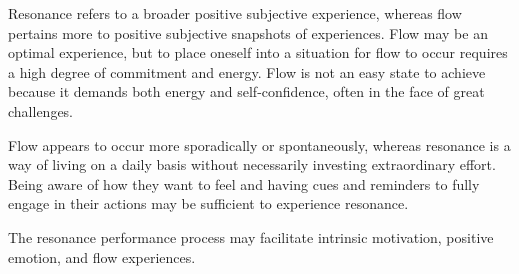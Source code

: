 \documentclass[ebook,12pt,oneside,openany]{memoir}
\begin{document}
Resonance refers to a broader positive subjective experience, whereas flow pertains more to positive subjective snapshots of experiences.
Flow may be an optimal experience, but to place oneself into a situation for flow to occur requires a high degree of commitment and energy.
Flow is not an easy state to achieve because it demands both energy and self-confidence, often in the face of great challenges.

Flow appears to occur more sporadically or spontaneously, whereas resonance is a way of living on a daily basis without necessarily investing extraordinary effort.
Being aware of how they want to feel and having cues and reminders to fully engage in their actions may be sufficient to experience resonance.

The resonance performance process may facilitate intrinsic motivation, positive emotion, and flow experiences.
\end{document}
